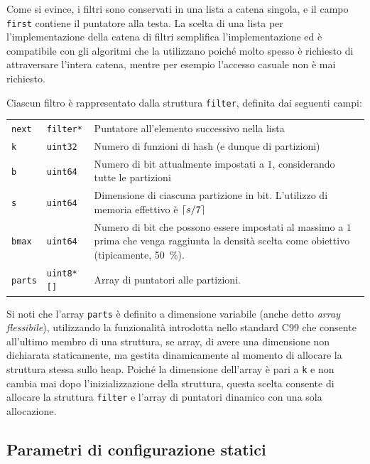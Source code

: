 Come si evince, i filtri sono conservati in una lista a catena singola, e il campo \verb|first|
contiene il puntatore alla testa. La scelta di una lista per l'implementazione della catena di
filtri semplifica l'implementazione ed è compatibile con gli algoritmi che la utilizzano poiché
molto spesso è richiesto di attraversare l'intera catena, mentre per esempio l'accesso casuale non è
mai richiesto.

Ciascun filtro è rappresentato dalla struttura \verb|filter|, definita dai seguenti campi:

\medskip
\begin{tabular}{ |l|l|p{280pt}| }
  \hline

  \verb|next| & \verb|filter*| & Puntatore all'elemento successivo nella lista \\

  \verb|k| & \verb|uint32| & Numero di funzioni di hash (e dunque di partizioni) \\

  \verb|b| & \verb|uint64| & Numero di bit attualmente impostati a $1$, considerando tutte le partizioni \\

  \verb|s| & \verb|uint64| & Dimensione di ciascuna partizione in bit. L'utilizzo di memoria
  effettivo è $\lceil s/7\rceil$ \\

  \verb|bmax| & \verb|uint64| & Numero di bit che possono essere impostati al massimo a $1$ prima
  che venga raggiunta la densità scelta come obiettivo (tipicamente, \SI{50}{\percent}). \\

  \verb|parts| & \verb|uint8*[]| & Array di puntatori alle partizioni. \\

  \hline
\end{tabular}
\medskip

Si noti che l'array \verb|parts| è definito a dimensione variabile (anche detto \emph{array
flessibile}), utilizzando la funzionalità introdotta nello standard C99 che consente all'ultimo
membro di una struttura, se array, di avere una dimensione non dichiarata staticamente, ma gestita
dinamicamente al momento di allocare la struttura stessa sullo heap. Poiché la dimensione dell'array
è pari a \verb|k| e non cambia mai dopo l'inizializzazione della struttura, questa scelta consente
di allocare la struttura \verb|filter| e l'array di puntatori dinamico con una sola allocazione.

\subsection{Parametri di configurazione statici}
\label{sec:patch:staticparms}

